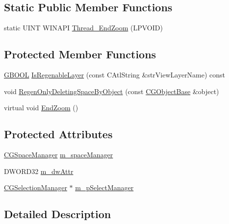 \subsection*{Static Public Member Functions}
\begin{DoxyCompactItemize}
\item 
static U\+I\+N\+T W\+I\+N\+A\+P\+I \hyperlink{class_c_g3_d_space_view_a52923271597a322ef6168461f3310672}{Thread\+\_\+\+End\+Zoom} (L\+P\+V\+O\+I\+D)
\end{DoxyCompactItemize}
\subsection*{Protected Member Functions}
\begin{DoxyCompactItemize}
\item 
\hyperlink{_g_types_8h_a2901915743626352a6820c5405f556dc}{G\+B\+O\+O\+L} \hyperlink{class_c_g3_d_space_view_a5aca5ec0fd7cef848aa9d41b10bf08b3}{Is\+Regenable\+Layer} (const C\+Atl\+String \&str\+View\+Layer\+Name) const 
\item 
void \hyperlink{class_c_g3_d_space_view_a7b2ab69e7a9e8d0a0c9f2b9117980bc0}{Regen\+Only\+Deleting\+Space\+By\+Object} (const \hyperlink{class_c_g_object_base}{C\+G\+Object\+Base} \&object)
\item 
virtual void \hyperlink{class_c_g3_d_space_view_a6dfd5d319836c6ddda121a15662121cd}{End\+Zoom} ()
\end{DoxyCompactItemize}
\subsection*{Protected Attributes}
\begin{DoxyCompactItemize}
\item 
\hyperlink{class_c_g_space_manager}{C\+G\+Space\+Manager} \hyperlink{class_c_g3_d_space_view_add0273d1c28e0d7370498aa953da1824}{m\+\_\+space\+Manager}
\item 
D\+W\+O\+R\+D32 \hyperlink{class_c_g3_d_space_view_a7d864ed2b5edb36c67802b090a959855}{m\+\_\+dw\+Attr}
\item 
\hyperlink{class_c_g_selection_manager}{C\+G\+Selection\+Manager} $\ast$ \hyperlink{class_c_g3_d_space_view_af4baa948247532603af5eb5f2be6d942}{m\+\_\+p\+Select\+Manager}
\end{DoxyCompactItemize}


\subsection{Detailed Description}


